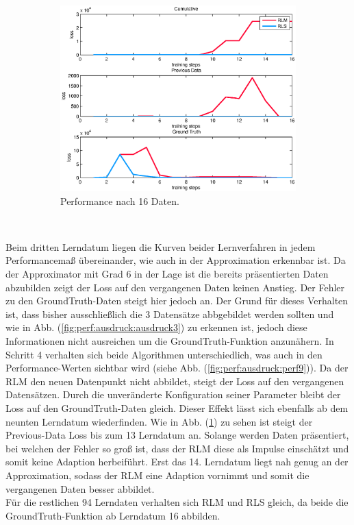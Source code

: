 \documentclass[a4paper, 12pt]{article}
\begin{document}
{\begin{figure}[H]
\begin{subfigure}[b]{0.4\textwidth}
                \includegraphics[width=\textwidth]{./images/copyofstats/ausdruck6_perf_piece_16.eps}
                \caption{Performance nach 16 Daten.}
                \label{fig:perf:ausdruck:perf16}
        \end{subfigure}
        \\
        \caption{}
        \label{fig:perf:ausdruck:perf}
\end{figure}
Beim dritten Lerndatum liegen die Kurven beider Lernverfahren in jedem Performancemaß übereinander, wie auch in der Approximation erkennbar ist. Da der Approximator mit Grad 6 in der Lage ist die bereits präsentierten Daten abzubilden zeigt der Loss auf den vergangenen Daten keinen Anstieg. Der Fehler zu den GroundTruth-Daten steigt hier jedoch an. Der Grund für dieses Verhalten ist, dass bisher ausschließlich die 3 Datensätze abbgebildet werden sollten und wie in Abb. (\ref{fig:perf:ausdruck:ausdruck3}) zu erkennen ist, jedoch diese Informationen nicht ausreichen um die GroundTruth-Funktion anzunähern.
In Schritt 4 verhalten sich beide Algorithmen unterschiedlich, was auch in den Performance-Werten sichtbar wird (siehe Abb. (\ref{fig:perf:ausdruck:perf9})). Da der RLM den neuen Datenpunkt nicht abbildet, steigt der Loss auf den vergangenen Datensätzen. Durch die unveränderte Konfiguration seiner Parameter bleibt der Loss auf den GroundTruth-Daten gleich. Dieser Effekt lässt sich ebenfalls ab dem neunten Lerndatum wiederfinden. Wie in Abb. (\ref{fig:perf:ausdruck:perf16}) zu sehen ist steigt der Previous-Data Loss bis zum 13 Lerndatum an. Solange werden Daten präsentiert, bei welchen der Fehler so groß ist, dass der RLM diese als Impulse einschätzt und somit keine Adaption herbeiführt. Erst das 14. Lerndatum liegt nah genug an der Approximation, sodass der RLM eine Adaption vornimmt und somit die vergangenen Daten besser abbildet.\\
Für die restlichen 94 Lerndaten verhalten sich RLM und RLS gleich, da beide die GroundTruth-Funktion ab Lerndatum 16 abbilden.

}
\end{document}
